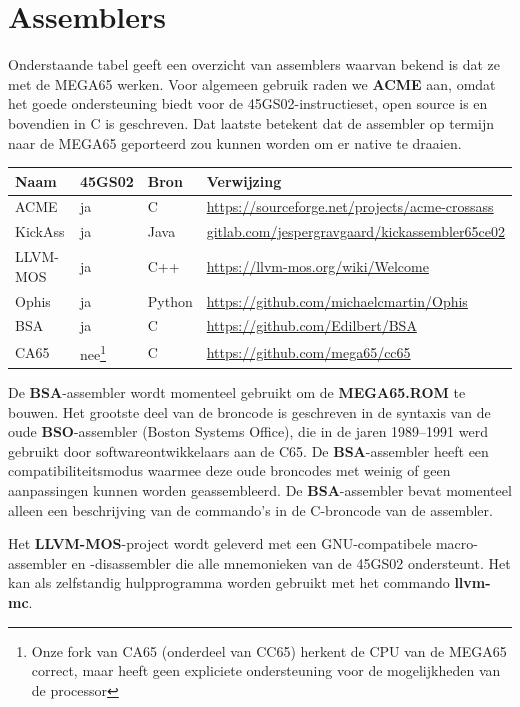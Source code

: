 \chapter{Assemblers}

Onderstaande tabel geeft een overzicht van assemblers waarvan bekend is dat ze met de MEGA65 werken.
Voor algemeen gebruik raden we {\bf ACME} aan, omdat het goede ondersteuning biedt voor de
45GS02-instructieset, open source is en bovendien in C is geschreven. Dat laatste
betekent dat de assembler op termijn naar de MEGA65 geporteerd zou kunnen worden om er native te draaien.

\begin{longtable}{ | l | l | l | l |}\hline
Naam     & 45GS02 & Bron & Verwijzing \\\hline
ACME     &  ja    & C    & \url{https://sourceforge.net/projects/acme-crossass}\\
KickAss  &  ja    & Java & \href{https://gitlab.com/jespergravgaard/kickassembler65ce02}{gitlab.com/jespergravgaard/kickassembler65ce02}\\
LLVM-MOS &  ja    & C++  & \url{https://llvm-mos.org/wiki/Welcome}\\
Ophis    &  ja    & Python & \url{https://github.com/michaelcmartin/Ophis}\\
BSA      &  ja    & C    & \url{https://github.com/Edilbert/BSA}\\
CA65     &  nee\footnote{Onze fork van CA65 (onderdeel van CC65) herkent de CPU van de MEGA65 correct, maar heeft geen expliciete ondersteuning voor de mogelijkheden van de processor} & C & \url{https://github.com/mega65/cc65}\\\hline
\end{longtable}

De {\bf BSA}-assembler wordt momenteel gebruikt om de {\bf MEGA65.ROM} te bouwen.
Het grootste deel van de broncode is geschreven in de syntaxis van de oude
{\bf BSO}-assembler (Boston Systems Office), die in de jaren 1989--1991 werd
gebruikt door softwareontwikkelaars aan de C65. De {\bf BSA}-assembler heeft een
compatibiliteitsmodus waarmee deze oude broncodes met weinig of geen aanpassingen
kunnen worden geassembleerd. De {\bf BSA}-assembler bevat momenteel alleen een
beschrijving van de commando's in de C-broncode van de assembler.

Het {\bf LLVM-MOS}-project wordt geleverd met een GNU-compatibele macro-assembler
en -disassembler die alle mnemonieken van de 45GS02 ondersteunt. Het kan als
zelfstandig hulpprogramma worden gebruikt met het commando {\bf llvm-mc}.
